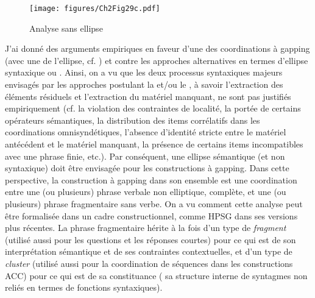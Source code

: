 \begin{figure}[p]
\texttt{[image: figures/Ch2Fig29c.pdf]}%
\caption{Analyse sans ellipse}
\label{ch2:fig29c}
\end{figure}

J’ai donné des arguments empiriques en faveur d’une  des coordinations à gapping (avec une  de l’ellipse, cf. ) et contre les approches alternatives en termes d’ellipse syntaxique ou . Ainsi, on a vu que les deux processus syntaxiques majeurs envisagés par les approches postulant la  et/ou le , à savoir l’extraction des éléments résiduels et l’extraction du matériel manquant, ne sont pas justifiés empiriquement (cf. la violation des contrain\-tes de localité, la portée de certains opérateurs sémantiques, la distribution des items corrélatifs dans les coordinations omnisyndétiques, l’absence d’identité stricte entre le matériel antécédent et le matériel manquant, la présence de certains items incompatibles avec une phrase finie, etc.). Par conséquent, une ellipse sémantique (et non syntaxique) doit être envisagée pour les constructions à gapping. Dans cette perspective, la construction à gapping dans son ensemble est une coordination entre une (ou plusieurs) phrase verbale non elliptique, complète, et une (ou plusieurs) phrase fragmentaire sans verbe. On a vu comment cette analyse peut être formalisée dans un cadre constructionnel, comme HPSG dans ses versions plus récentes. La phrase fragmentaire hérite à la fois d’un type de \textit{fragment} (utilisé aussi pour les questions et les réponses courtes) pour ce qui est de son interprétation sémantique et de ses contraintes contextuelles, et d’un type de \textit{cluster} (utilisé aussi pour la coordination de séquences dans les constructions ACC) pour ce qui est de sa constituance ({\cad} sa structure interne de syntagmes non reliés en termes de fonctions syntaxiques).


